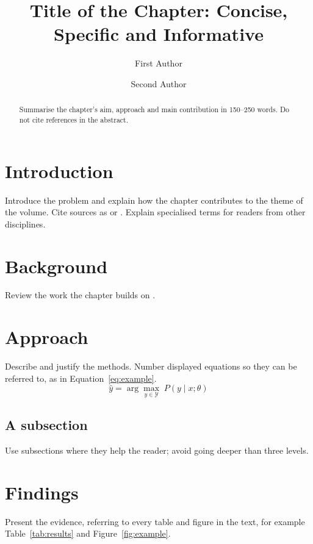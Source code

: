 \documentclass[chapter,lineno,{{CITEOPT}}]{nextgeniq}
\title{Title of the Chapter: Concise, Specific and Informative}
\author[1]{First Author}
\author[2]{Second Author}
\affil[1]{Department, University, City, Country}
\affil[2]{Department, Institution, City, Country}
\begin{document}
\maketitle

\begin{abstract}
Summarise the chapter's aim, approach and main contribution in 150--250 words.
Do not cite references in the abstract.
\end{abstract}

\section{Introduction}
\label{sec:intro}

Introduce the problem and explain how the chapter contributes to the theme of
the volume. Cite sources as \citet{smith2024} or \citep{lee2023,garcia2022}.
Explain specialised terms for readers from other disciplines.

\section{Background}
\label{sec:background}

Review the work the chapter builds on \citep{garcia2022}.

\section{Approach}
\label{sec:approach}

Describe and justify the methods. Number displayed equations so they can be
referred to, as in Equation~\eqref{eq:example}.
\begin{equation}
  \hat{y} = \arg\max_{y \in \mathcal{Y}} \; P(y \mid x; \theta)
  \label{eq:example}
\end{equation}

\subsection{A subsection}
Use subsections where they help the reader; avoid going deeper than three
levels.

\section{Findings}
\label{sec:findings}

Present the evidence, referring to every table and figure in the text, for
example Table~\ref{tab:results} and Figure~\ref{fig:example}.
\end{document}
